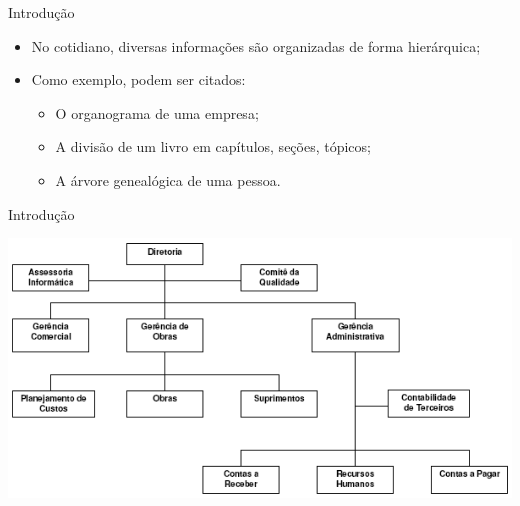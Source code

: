 \documentclass[12pt,table,xcolor={dvipsnames}]{beamer}
\begin{document}
\begin{frame}[fragile]{Introdução}
\begin{itemize}
\item No cotidiano, diversas informações são organizadas de forma hierárquica;
\item Como exemplo, podem ser citados:
\begin{itemize}
\item  O organograma de uma empresa;
\item  A divisão de um livro em capítulos, seções, tópicos;
\item  A árvore genealógica de uma pessoa.
\end{itemize}
\end{itemize}
\end{frame}

\begin{frame}[fragile]{Introdução}
          \begin{center}
          \includegraphics[scale=.5]{empresa.png} 
          \end{center}
\end{frame}
\end{document}
